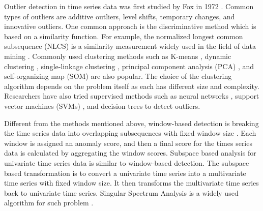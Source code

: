 Outlier detection in time series data was first studied by Fox in 1972
\cite{fox1972outliers}. Common types of outliers are additive outliers,
level shifts, temporary changes, and innovative outliers. One common
approach is the discriminative method which is based on a similarity
function. For example, the normalized longest common subsequence
(NLCS) is a similarity measurement widely used in the field of data
mining \cite{budalakoti2009anomaly, chandola2008comparative,
sequeira2002admit}. Commonly used clustering methods such as
K-means \cite{macqueen1967some}, dynamic clustering
\cite{sequeira2002admit}, single-linkage clustering
\cite{portnoy2001intrusion}, principal component analysis (PCA)
\cite{gupta2013context}, and self-organizing map (SOM)
\cite{gonzalez2003anomaly} are also popular. The choice of the
clustering algorithm depends on the problem itself as each has
different size and complexity. 
Researchers have also tried supervised
methods such as neural networks \cite{dasgupta2000comparison},
support vector machines (SVMs) \cite{li2006motion}, and decision
trees \cite{kang2005learning} to detect outliers.

Different from the methods mentioned above, window-based detection is
breaking the time series data into overlapping subsequences with fixed
window size \cite{cheboli2010anomaly}. Each window is assigned an
anomaly score, and then a final score for the times series data is
calculated by aggregating the window scores. Subspace based analysis for
univariate time series data is similar to window-based detection. The
subspace based transformation is to convert a univariate time series
into a multivariate time series with fixed window size. It then
transforms the multivariate time series back to univariate time series.
Singular Spectrum Analysis is a widely used algorithm for such problem
\cite{golyandina2013singular}.

